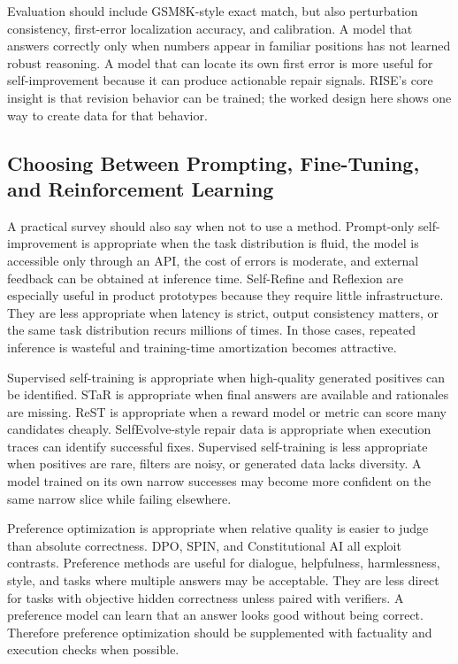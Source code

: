 Evaluation should include GSM8K-style exact match, but also perturbation consistency, first-error localization accuracy, and calibration. A model that answers correctly only when numbers appear in familiar positions has not learned robust reasoning. A model that can locate its own first error is more useful for self-improvement because it can produce actionable repair signals. RISE's core insight is that revision behavior can be trained; the worked design here shows one way to create data for that behavior.

\subsection{Choosing Between Prompting, Fine-Tuning, and Reinforcement Learning}
\label{subsec:choosing-prompt-ft-rl}

A practical survey should also say when not to use a method. Prompt-only self-improvement is appropriate when the task distribution is fluid, the model is accessible only through an API, the cost of errors is moderate, and external feedback can be obtained at inference time. Self-Refine and Reflexion are especially useful in product prototypes because they require little infrastructure. They are less appropriate when latency is strict, output consistency matters, or the same task distribution recurs millions of times. In those cases, repeated inference is wasteful and training-time amortization becomes attractive.

Supervised self-training is appropriate when high-quality generated positives can be identified. STaR is appropriate when final answers are available and rationales are missing. ReST is appropriate when a reward model or metric can score many candidates cheaply. SelfEvolve-style repair data is appropriate when execution traces can identify successful fixes. Supervised self-training is less appropriate when positives are rare, filters are noisy, or generated data lacks diversity. A model trained on its own narrow successes may become more confident on the same narrow slice while failing elsewhere.

Preference optimization is appropriate when relative quality is easier to judge than absolute correctness. DPO, SPIN, and Constitutional AI all exploit contrasts. Preference methods are useful for dialogue, helpfulness, harmlessness, style, and tasks where multiple answers may be acceptable. They are less direct for tasks with objective hidden correctness unless paired with verifiers. A preference model can learn that an answer looks good without being correct. Therefore preference optimization should be supplemented with factuality and execution checks when possible.

